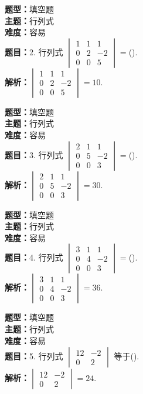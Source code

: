 \documentclass{ctexart}
\newenvironment{question}[5]{%
	\noindent\textbf{题型：}#1\\
	\textbf{主题：}#2\\
	\textbf{难度：}#3\\
	\textbf{题目：}#4\\
	\textbf{解析：}#5\\
	\vspace{1em}
}{}
\begin{document}
	\begin{question}
		{填空题}
		{行列式}
		{容易}
		{2. 行列式 \(\begin{vmatrix} 1 & 1 & 1 \\ 0 & 2 & -2 \\ 0 & 0 & 5\end{vmatrix}=\)(\qquad). }
		{\(\begin{vmatrix} 1 & 1 & 1 \\ 0 & 2 & -2 \\ 0 & 0 & 5\end{vmatrix}=10\).}
	\end{question}
	
	\begin{question}
		{填空题}
		{行列式}
		{容易}
		{3. 行列式 \(\begin{vmatrix} 2 & 1 & 1 \\ 0 & 5 & -2 \\ 0 & 0 & 3\end{vmatrix}=\)(\qquad). }
		{\(\begin{vmatrix} 2 & 1 & 1 \\ 0 & 5 & -2 \\ 0 & 0 & 3\end{vmatrix}=30\).}
	\end{question}
	
	\begin{question}
		{填空题}
		{行列式}
		{容易}
		{4. 行列式 \(\begin{vmatrix} 3 & 1 & 1 \\ 0 & 4 & -2 \\ 0 & 0 & 3\end{vmatrix}=\)(\qquad). }
		{\(\begin{vmatrix} 3 & 1 & 1 \\ 0 & 4 & -2 \\ 0 & 0 & 3\end{vmatrix}=36\).}
	\end{question}
	
	\begin{question}
		{填空题}
		{行列式}
		{容易}
		{5. 行列式 \(\begin{vmatrix} 12 & -2 \\ 0 & 2\end{vmatrix}\) 等于(\qquad). }
		{\(\begin{vmatrix} 12 & -2 \\ 0 & 2\end{vmatrix}=24\).}
	\end{question}
	
\end{document}
